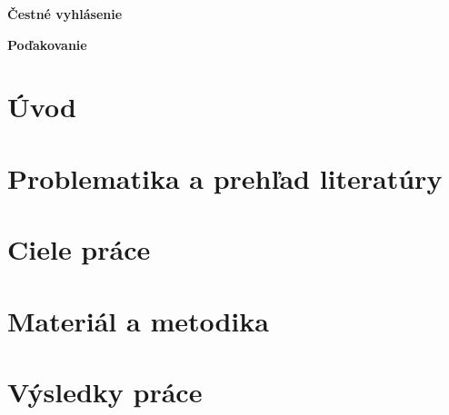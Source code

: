 \documentclass[12pt,a4paper]{article}
\begin{document}
\setcounter{page}{2}

\null
\vfill
\thispagestyle{empty}

\noindent
\textbf{Čestné vyhlásenie} %



\vspace{6cm}
\newpage

\null
\vfill

\noindent
\textbf{Poďakovanie} %



\vspace{6cm}

\tableofcontents



\section{Úvod}


\section{Problematika a prehľad literatúry}


\section{Ciele práce}


\section{Materiál a metodika}


\section{Výsledky práce}

\end{document}

